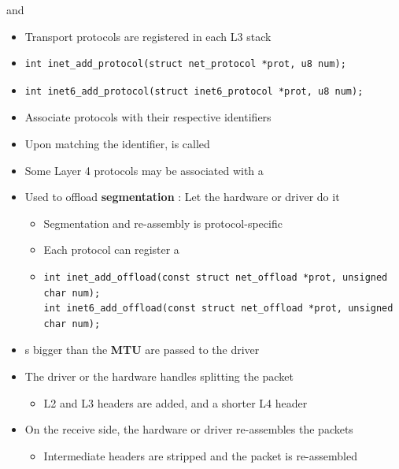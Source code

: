 \begin{frame}[fragile]{ and }
	\begin{itemize}
		\item Transport protocols are registered in each L3 stack
		\item \begin{verbatim}
int inet_add_protocol(struct net_protocol *prot, u8 num);
		\end{verbatim}
		\item \begin{verbatim}
int inet6_add_protocol(struct inet6_protocol *prot, u8 num);
		\end{verbatim}
	\item Associate protocols with their respective identifiers
	\item Upon matching the  identifier,  is called

	\end{itemize}
\end{frame}

\begin{frame}[fragile]{}
	\begin{itemize}
		\item Some Layer 4 protocols may be associated with a 
		\item Used to offload \textbf{segmentation} : Let the hardware or driver do it
			\begin{itemize}
				\item Segmentation and re-assembly is protocol-specific
				\item Each protocol can register a 
				\item \begin{verbatim}
int inet_add_offload(const struct net_offload *prot, unsigned char num);
int inet6_add_offload(const struct net_offload *prot, unsigned char num);
				\end{verbatim}
			\end{itemize}
		\item {}s bigger than the \textbf{MTU} are passed to the driver
		\item The driver or the hardware handles splitting the packet
			\begin{itemize}
				\item L2 and L3 headers are added, and a shorter L4 header
			\end{itemize}
		\item On the receive side, the hardware or driver re-assembles the packets
			\begin{itemize}
				\item Intermediate headers are stripped and the packet is re-assembled
			\end{itemize}
	\end{itemize}
\end{frame}

